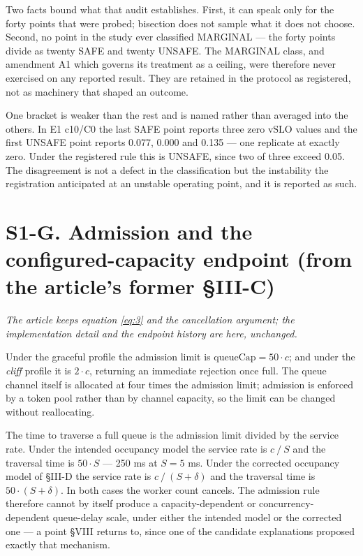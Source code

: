 \documentclass{ieeeaccess}
\begin{document}
Two facts bound what that audit establishes. First, it can speak only for the forty points that were probed; bisection does not sample what it does not choose. Second, no point in the study ever classified MARGINAL --- the forty points divide as twenty SAFE and twenty UNSAFE. The MARGINAL class, and amendment A1 which governs its treatment as a ceiling, were therefore never exercised on any reported result. They are retained in the protocol as registered, not as machinery that shaped an outcome.

One bracket is weaker than the rest and is named rather than averaged into the others. In E1 c10/C0 the last SAFE point reports three zero $\mathrm{vSLO}$ values and the first UNSAFE point reports 0.077, 0.000 and 0.135 --- one replicate at exactly zero. Under the registered rule this is UNSAFE, since two of three exceed 0.05. The disagreement is not a defect in the classification but the instability the registration anticipated at an unstable operating point, and it is reported as such.

\section*{S1-G. Admission and the configured-capacity endpoint (from the article's former \S{}III-C)}

\textit{The article keeps equation \eqref{eq:3} and the cancellation argument; the implementation detail and the endpoint history are here, unchanged.}

Under the graceful profile the admission limit is $\mathrm{queueCap} = 50 \cdot c$; and under the \textit{cliff} profile it is $2 \cdot c$, returning an immediate rejection once full. The queue channel itself is allocated at four times the admission limit; admission is enforced by a token pool rather than by channel capacity, so the limit can be changed without reallocating.

The time to traverse a full queue is the admission limit divided by the service rate. Under the intended occupancy model the service rate is $c \mathbin{/} S$ and the traversal time is $50 \cdot S$ --- 250 ms at $S = 5$ ms. Under the corrected occupancy model of \S{}III-D the service rate is $c \mathbin{/} (S + \delta)$ and the traversal time is $50 \cdot (S + \delta)$. In both cases the worker count cancels. The admission rule therefore cannot by itself produce a capacity-dependent or concurrency-dependent queue-delay scale, under either the intended model or the corrected one --- a point \S{}VIII returns to, since one of the candidate explanations proposed exactly that mechanism.
\end{document}
